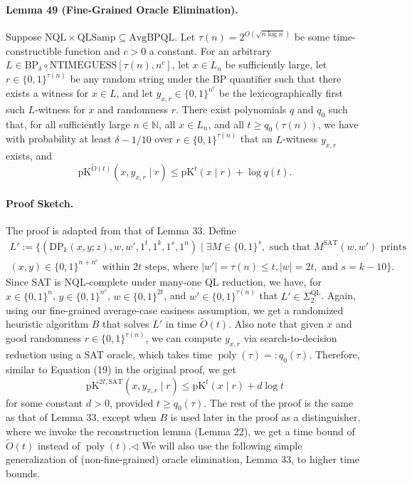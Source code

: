 \paragraph{Lemma 49 (Fine-Grained Oracle Elimination).} Suppose $\mathrm{NQL}\times\mathrm{QLSamp}\subseteq\mathrm{AvgBPQL}$. Let $\tau(n)=2^{O(\sqrt{n\log n})}$ be some time-constructible function and $c>0$ a constant. For an arbitrary $L\in\mathrm{BP}_\delta\circ\mathrm{NTIMEGUESS}[\tau(n),n^c]$, let $x\in L_n$ be sufficiently large, let $r\in\{0,1\}^{\tau(n)}$ be any random string under the BP quantifier such that there exists a witness for $x\in L$, and let $y_{x,r}\in\{0,1\}^{n^c}$ be the lexicographically first such $L$-witness for $x$ and randomness $r$.
There exist polynomials $q$ and $q_0$ such that, for all sufficiently large $n\in\mathbb N$, all $x\in L_n$, and all $t\geq q_0(\tau(n))$, we have with probability at least $\delta-1/10$ over $r\in\{0,1\}^{\tau(n)}$ that an $L$-witness $y_{x,r}$ exists, and
\[\mathrm{pK}^{\widetilde O(t)}(x,y_{x,r}\mid r)\leq\mathrm{pK}^t(x\mid r)+\log q(t).\]
\paragraph{Proof Sketch.} The proof is adapted from that of Lemma 33. Define
\begin{multline*}
L':=\{(\mathrm{DP}_k(x,y;z),w,w',1^t,1^k,1^s,1^n)\mid\exists M\in\{0,1\}^s,\text{ such that }M^{\mathrm{SAT}}(w,w')\text{ prints}\\
(x,y)\in\{0,1\}^{n+n^c}\text{ within }2t\text{ steps, where }|w'|=\tau(n)\leq t,|w|=2t,\text{ and }s=k-10\}.
\end{multline*}
Since SAT is NQL-complete under many-one QL reduction, we have, for $x\in\{0,1\}^n$, $y\in\{0,1\}^{n^c}$, $w\in\{0,1\}^{2t}$, and $w'\in\{0,1\}^{\tau(n)}$ that $L'\in\Sigma_2^{\mathrm{QL}}$.
Again, using our fine-grained average-case easiness assumption, we get a randomized heuristic algorithm $B$ that solves $L'$ in time $\widetilde O(t)$. Also note that given $x$ and good randomness $r\in\{0,1\}^{\tau(n)}$, we can compute $y_{x,r}$ via search-to-decision reduction using a SAT oracle, which takes time $\operatorname{poly}(\tau)=:q_0(\tau)$. Therefore, similar to Equation (19) in the original proof, we get
\[\mathrm{pK}^{2t,\mathrm{SAT}}(x,y_{x,r}\mid r)\leq\mathrm{pK}^t(x\mid r)+d\log t\tag{30}\]
for some constant $d>0$, provided $t\geq q_0(\tau)$. The rest of the proof is the same as that of Lemma 33, except when $B$ is used later in the proof as a distinguisher, where we invoke the reconstruction lemma (Lemma 22), we get a time bound of $\widetilde O(t)$ instead of $\operatorname{poly}(t)$.\hfill$\triangleleft$
We will also use the following simple generalization of (non-fine-grained) oracle elimination, Lemma 33, to higher time bounds.
